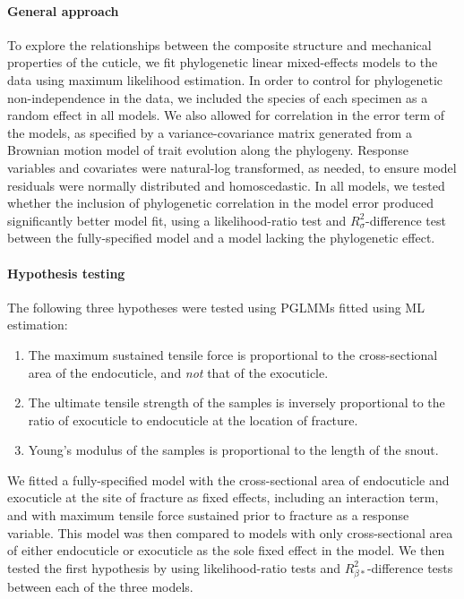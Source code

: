\documentclass[twocolumn, linenumbers, superscriptaddress]{revtex4-1}
\begin{document}
			\paragraph*{General approach}
				To explore the relationships between the composite structure and mechanical properties of the cuticle, we fit phylogenetic linear mixed-effects models to the data using maximum likelihood estimation.
				In order to control for phylogenetic non-independence in the data, we included the species of each specimen as a random effect in all models.
				We also allowed for correlation in the error term of the models, as specified by a variance-covariance matrix generated from a Brownian motion model of trait evolution along the phylogeny.
				Response variables and covariates were natural-log transformed, as needed, to ensure model residuals were normally distributed and homoscedastic.
				In all models, we tested whether the inclusion of phylogenetic correlation in the model error produced significantly better model fit, using a likelihood-ratio test and $R^{2}_{\sigma}$-difference test between the fully-specified model and a model lacking the phylogenetic effect.
			\paragraph*{Hypothesis testing}
				The following three hypotheses were tested using PGLMMs fitted using ML estimation:
				\begin{enumerate}
				\item The maximum sustained tensile force is proportional to the cross-sectional area of the endocuticle, and \emph{not} that of the exocuticle.
				\item The ultimate tensile strength of the samples is inversely proportional to the ratio of exocuticle to endocuticle at the location of fracture.
				\item Young's modulus of the samples is proportional to the length of the snout.
				\end{enumerate}
				
				We fitted a fully-specified model with the cross-sectional area of endocuticle and exocuticle at the site of fracture as fixed effects, including an interaction term, and with maximum tensile force sustained prior to fracture as a response variable.
				This model was then compared to models with only cross-sectional area of either endocuticle or exocuticle as the sole fixed effect in the model.
				We then tested the first hypothesis by using likelihood-ratio tests and $R^{2}_{\beta*}$-difference tests between each of the three models.
				
\end{document}
